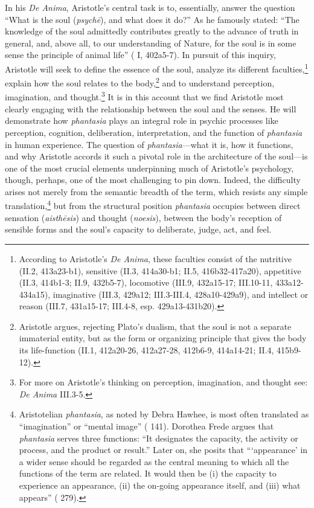 \documentclass{article}
\begin{document}
In his \textit{De Anima}, Aristotle's central task is to, essentially, answer the question ``What is the soul (\textit{psychē}), and what does it do?'' As he famously stated: ``The knowledge of the soul admittedly contributes greatly to the advance of truth in general, and, above all, to our understanding of Nature, for the soul is in some sense the principle of animal life'' ( I, 402a5-7). In pursuit of this inquiry, Aristotle will seek to define the essence of the soul, analyze its different faculties,\footnote{According to Aristotle's \textit{De Anima}, these faculties consist of the nutritive (II.2, 413a23-b1), sensitive (II.3, 414a30-b1; II.5, 416b32-417a20), appetitive (II.3, 414b1-3; II.9, 432b5-7), locomotive (III.9, 432a15-17; III.10-11, 433a12-434a15), imaginative (III.3, 429a12; III.3-III.4, 428a10-429a9), and intellect or reason (III.7, 431a15-17; III.4-8, esp. 429a13-431b20).} explain how the soul relates to the body,\footnote{Aristotle argues, rejecting Plato's dualism, that the soul is not a separate immaterial entity, but as the form or organizing principle that gives the body its life-function (II.1, 412a20-26, 412a27-28, 412b6-9, 414a14-21; II.4, 415b9-12).} and to understand perception, imagination, and thought.\footnote{For more on Aristotle's thinking on perception, imagination, and thought see: \textit{De Anima} III.3-5.} It is in this account that we find Aristotle most clearly engaging with the relationship between the soul and the senses. He will demonstrate how \textit{phantasia} plays an integral role in psychic processes like perception, cognition, deliberation, interpretation, and the function of \textit{phantasia} in human experience. The question of \textit{phantasia}---what it is, how it functions, and why Aristotle accords it such a pivotal role in the architecture of the soul---is one of the most crucial elements underpinning much of Aristotle's psychology, though, perhaps, one of the most challenging to pin down. Indeed, the difficulty arises not merely from the semantic breadth of the term, which resists any simple translation,\footnote{Aristotelian \textit{phantasia}, as noted by Debra Hawhee, is most often translated as ``imagination'' or ``mental image'' (\cite{hawhee_aristotles_eyes} 141). Dorothea Frede argues that \textit{phantasia} serves three functions: ``It designates the capacity, the activity or process, and the product or result.'' Later on, she posits that ```appearance' in a wider sense should be regarded as the central meaning to which all the functions of the term are related. It would then be (i) the capacity to experience an appearance, (ii) the on-going appearance itself, and (iii) what appears'' (\cite{frede1992cognitive} 279).} but from the structural position \textit{phantasia} occupies between direct sensation (\textit{aisthēsis}) and thought (\textit{noesis}), between the body's reception of sensible forms and the soul's capacity to deliberate, judge, act, and feel. 
\end{document}
